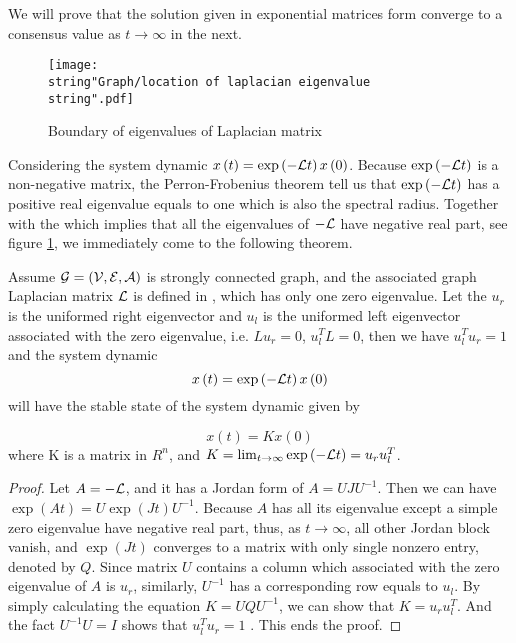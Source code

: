 We will prove that the solution given in exponential matrices form
 converge to a consensus value as
$t\to\infty$ in the next. 

\begin{figure}
\hfill{}\texttt{[image: \\string"Graph/location of laplacian eigenvalue\\string".pdf]}\hfill{}\hfill{}

\caption{\label{fig:Boundary-of-eigenvalues-1}Boundary of eigenvalues of Laplacian
matrix}
\end{figure}




Considering the system dynamic $x\left(t\right)=\exp\left(-{\cal L}t\right)x\left(0\right)$.
Because $\exp\left(-{\cal L}t\right)$ is a non-negative matrix, the
Perron-Frobenius theorem tell us that $\exp\left(-{\cal L}t\right)$
has a positive real eigenvalue equals to one which is also the spectral
radius. Together with the  which
implies that all the eigenvalues of $-{\cal L}$ have negative real
part, see figure \ref{fig:Boundary-of-eigenvalues-1}, we immediately
come to the following theorem.
\begin{thm}
Assume ${\cal G}=\left({\cal V},{\cal E},{\cal A}\right)$ is strongly
connected graph, and the associated graph Laplacian matrix ${\cal L}$
is defined in , which has only
one zero eigenvalue. Let the $u_{r}$ is the uniformed right eigenvector
and $u_{l}$ is the uniformed left eigenvector associated with the
zero eigenvalue, i.e. $Lu_{r}=0$, $u_{l}^{T}L=0$, then we have $u_{l}^{T}u_{r}=1$
and the system dynamic 
\begin{equation}
x\left(t\right)=\exp\left(-{\cal L}t\right)x\left(0\right)
\end{equation}
will have the stable state of the system dynamic given by

\begin{equation}
x\left(t\right)=Kx\left(0\right)
\end{equation}
 where K is a matrix in $R^{n}$, and $K=\lim_{t\to\infty}\exp\left(-{\cal L}t\right)=u_{r}u_{l}^{T}$. \end{thm}
\begin{proof}
Let $A=-{\cal L}$, and it has a Jordan form of $A=UJU^{-1}$. Then
we can have $\exp\left(At\right)=U\exp\left(Jt\right)U^{-1}$. Because
$A$ has all its eigenvalue except a simple zero eigenvalue have negative
real part, thus, as $t\to\infty$, all other Jordan block vanish,
and $\exp\left(Jt\right)$ converges to a matrix with only single
nonzero entry, denoted by $Q$. Since matrix $U$ contains a column
which associated with the zero eigenvalue of $A$ is $u_{r}$, similarly,
$U^{-1}$ has a corresponding row equals to $u_{l}$. By simply calculating
the equation $K=UQU^{-1}$, we can show that $K=u_{r}u_{l}^{T}$.
And the fact $U^{-1}U=I$ shows that $u_{l}^{T}u_{r}=1$ . This ends
the proof. 
\end{proof}
